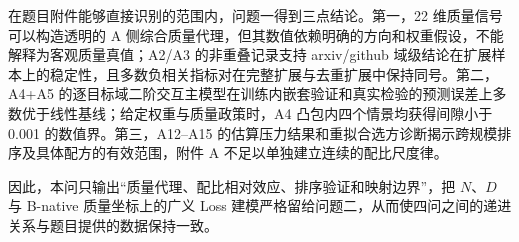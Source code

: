 在题目附件能够直接识别的范围内，问题一得到三点结论。第一，22 维质量信号可以构造透明的 A 侧综合质量代理，但其数值依赖明确的方向和权重假设，不能解释为客观质量真值；A2/A3 的非重叠记录支持 arxiv/github 域级结论在扩展样本上的稳定性，且多数负相关指标对在完整扩展与去重扩展中保持同号。第二，A4+A5 的逐目标域二阶交互主模型在训练内嵌套验证和真实检验的预测误差上多数优于线性基线；给定权重与质量政策时，A4 凸包内四个情景均获得间隙小于 0.001 的数值界。第三，A12--A15 的估算压力结果和重拟合选方诊断揭示跨规模排序及具体配方的有效范围，附件 A 不足以单独建立连续的配比尺度律。

因此，本问只输出“质量代理、配比相对效应、排序验证和映射边界”，把 $N$、$D$ 与 B-native 质量坐标上的广义 Loss 建模严格留给问题二，从而使四问之间的递进关系与题目提供的数据保持一致。
